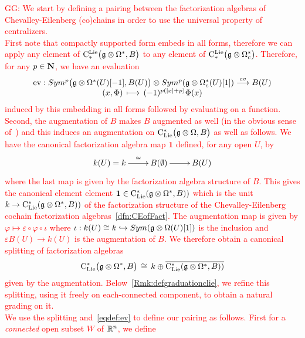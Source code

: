\documentclass[11pt]{amsart}
\numberwithin{equation}{section}
\def\greg{\textcolor{red}{GG: }\textcolor{red}}
\begin{document}
\greg{
We start by defining a pairing between the factorization algebras of Chevalley-Eilenberg (co)chains in order to use the universal property of centralizers.\\
First note that compactly supported form embeds in all forms, therefore we can apply 
any element of ${\rm C}^{\rm Lie}_*\big(\mathfrak g \otimes \Omega^* , B\big)$ 
to any element of ${\rm C}^{\rm Lie}_*\big(\mathfrak g \otimes \Omega_c^* \big)$. Therefore, for any  $p\in \mathbf N$, we have an evaluation 
\begin{equation} \label{eqdef:ev} \begin{array}{c}{\rm ev}: Sym^p \big( \mathfrak g \otimes \Omega^* (U)[-1] ,B(U)\big)
\otimes  Sym^p( \mathfrak g\otimes \Omega^*_c(U) [1]) \stackrel{ev}\longrightarrow B(U)  
  \\
 (x,\Phi) \,\longmapsto\, (-1)^{p(|x|+p) } \Phi (x)\end{array}
\end{equation} induced by this embedding  in all forms followed by evaluating on a function.\\
Second, the augmentation of $B$ makes $B$ augmented as well (in the obvious sense of~\cite{Gi-NotesFactorization}) and this induces an augmentation on
${\rm C}_{\rm Lie}^*\big(\mathfrak g\otimes \Omega , B \big)$ as well as follows. 
We have the canonical factorization algebra map  $\mathbf{1}$  defined, for any open $U$, by 
\[\xymatrix{ k(U)=k  \ar[r]^{\quad \cong}& 
B(\emptyset) \ar[r] & B(U)  } 
 \] where the last map is given by the factorization algebra structure of $B$. This gives the canonical element element 
 $\mathbf{1}\in {\rm C}_{\rm Lie}^*(\mathfrak g\otimes \Omega^*, B) )$ which is the unit $k\to {\rm C}_{\rm Lie}^*(\mathfrak g\otimes \Omega^*, B) )$
 of the factorization structure of 
 the Chevalley-Eilenberg cochain factorization algebras~\ref{dfn:CEofFact}.  
 The augmentation map is given by $\varphi\mapsto \varepsilon \circ \varphi \circ 
 \iota$ where $\iota: k(U) \cong k \hookrightarrow Sym(\mathfrak g \otimes \Omega (U) [1]) $ is the inclusion and $\varepsilon B(U)\to k(U)$ is the augmentation of 
 $B$. We therefore obtain a canonical splitting of factorization algebras 
 \begin{equation}\label{eq:splittingbyaugm}
   {\rm C}_{\rm Lie}^*\big(\mathfrak g\otimes \Omega^*, B\big)  \, \cong \, k \oplus \overline{ {\rm C}_{\rm Lie}^*(\mathfrak g\otimes \Omega^*, B) )}
 \end{equation}
given by the augmentation. Below~\ref{Rmk:defgraduationclie}, we refine  this splitting, using it  freely  on each-connected component, to obtain 
a natural grading on it.\\
We use the splitting and~\eqref{eqdef:ev} to define our pairing as follows. First for a \emph{connected} open subset $W$ of $\mathbb R^n$, we define 
}
\end{document}
